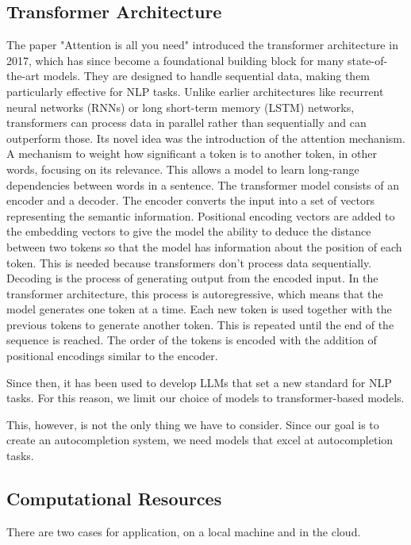 \subsection{Transformer Architecture}
The paper "Attention is all you need" \cite{NIPS2017_3f5ee243}  introduced the transformer architecture in 2017, which has since become a foundational building block for many state-of-the-art models. They are designed to handle sequential data, making them particularly effective for NLP tasks. Unlike earlier architectures like recurrent neural networks (RNNs) or long short-term memory (LSTM) networks, transformers can process data in parallel rather than sequentially and can outperform those.
Its novel idea was the introduction of the attention mechanism. A mechanism to weight how significant a token is to another token, in other words, focusing on its relevance. This allows a model to learn long-range dependencies between words in a sentence. The transformer model consists of an encoder and a decoder. The encoder converts the input into a set of vectors representing the semantic information. Positional encoding vectors are added to the embedding vectors to give the model the ability to deduce the distance between two tokens so that the model has information about the position of each token. This is needed because transformers don't process data sequentially. 
Decoding is the process of generating output from the encoded input. In the transformer architecture, this process is autoregressive, which means that the model generates one token at a time. Each new token is used together with the previous tokens to generate 
another token. This is repeated until the end of the sequence is reached.
The order of the tokens is encoded with the addition of positional encodings similar to the encoder.

Since then, it has been used to develop LLMs that set a new standard for NLP tasks.
For this reason, we limit our choice of models to transformer-based models.


This, however, is not the only thing we have to consider. Since our goal is to create an autocompletion system, we need models that excel at autocompletion tasks.


\subsection{Computational Resources}


There are two cases for application, on a local machine and in the cloud.



